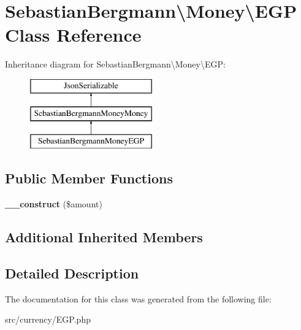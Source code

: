 \hypertarget{classSebastianBergmann_1_1Money_1_1EGP}{}\section{Sebastian\+Bergmann\textbackslash{}Money\textbackslash{}E\+G\+P Class Reference}
\label{classSebastianBergmann_1_1Money_1_1EGP}
Inheritance diagram for Sebastian\+Bergmann\textbackslash{}Money\textbackslash{}E\+G\+P\+:\begin{figure}[H]
\begin{center}
\leavevmode
\includegraphics[height=3.000000cm]{classSebastianBergmann_1_1Money_1_1EGP}
\end{center}
\end{figure}
\subsection*{Public Member Functions}
\begin{DoxyCompactItemize}
\item 
\hypertarget{classSebastianBergmann_1_1Money_1_1EGP_a2b917dc5e24d472092c65b312bd91563}{}{\bfseries \+\_\+\+\_\+construct} (\$amount)\label{classSebastianBergmann_1_1Money_1_1EGP_a2b917dc5e24d472092c65b312bd91563}

\end{DoxyCompactItemize}
\subsection*{Additional Inherited Members}


\subsection{Detailed Description}


The documentation for this class was generated from the following file\+:\begin{DoxyCompactItemize}
\item 
src/currency/E\+G\+P.\+php\end{DoxyCompactItemize}
